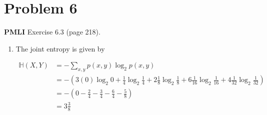 \documentclass[11pt,twoside]{article}
\newcommand{\pts}[1]{\marginpar{ \small\hspace{0pt} \textit{[#1]} } }
\newcommand{\lt}{\left}
\newcommand{\rt}{\right}
\newcommand{\?}{\stackrel{?}{=}}
\newcommand{\fr}{\frac}
\newcommand{\bl}{\color{blue}}
\newenvironment{solution}{\begin{adjustwidth}{.05\textwidth}{}\bl}{\medskip\end{adjustwidth}}
\begin{document}
\section*{Problem 6 }
\textbf{PMLI} Exercise 6.3 (page 218).
\begin{enumerate}[\bf (a)]
\item The joint entropy is given by \pts{2}
  \begin{solution}
    \begin{align*}
      \mathbb{H}(X,Y) &= -\sum_{x,y}p(x,y)\log_{2}p(x,y) \\
                      &=-\lt(3(0)\log_{2}0 +\fr{1}{4}\log_{2}\fr{1}{4} +  2\fr{1}{8}\log_{2}\fr{1}{8} + 6\fr{1}{16}\log_{2}\fr{1}{16}
                        + 4\fr{1}{32}\log_{2}\fr{1}{32}\rt) \\
                      &= -\lt(0 - \fr24 -\fr34 -\fr64 - \fr58\rt) \\
                      &= 3\tfrac38
    \end{align*}
  \end{solution}


\end{enumerate}
\end{document}
